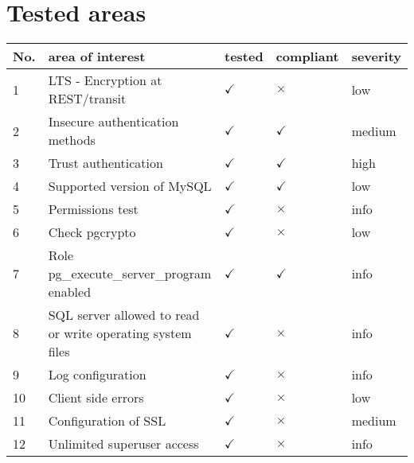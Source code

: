 
        \section{Tested areas}
        \begin{center}
        \begin{tabular}{ | m{1cm} | m{15em} | m{1.5cm} | m{1.7cm} | m{1.5cm}|}
            \hline
            \textbf{No.} & \textbf{area of interest} & \textbf{tested} & \textbf{compliant} &\textbf{severity}\\
            \hline
            1 & LTS - Encryption at REST/transit & $\checkmark$ & $\times$ & low \\\hline
    2 & Insecure authentication methods & $\checkmark$ & $\checkmark$ & medium \\\hline
    3 & Trust authentication & $\checkmark$ & $\checkmark$ & high \\\hline
    4 & Supported version of MySQL & $\checkmark$ & $\checkmark$ & low \\\hline
    5 & Permissions test & $\checkmark$ & $\times$ & info \\\hline
    6 & Check pgcrypto & $\checkmark$ & $\times$ & low \\\hline
    7 & Role pg\_execute\_server\_program enabled & $\checkmark$ & $\checkmark$ & info \\\hline
    8 & SQL server allowed to read or write operating system files & $\checkmark$ & $\times$ & info \\\hline
    9 & Log configuration & $\checkmark$ & $\times$ & info \\\hline
    10 & Client side errors & $\checkmark$ & $\times$ & low \\\hline
    11 & Configuration of SSL & $\checkmark$ & $\times$ & medium \\\hline
    12 & Unlimited superuser access & $\checkmark$ & $\times$ & info \\\hline

        \end{tabular}
        \end{center}
        